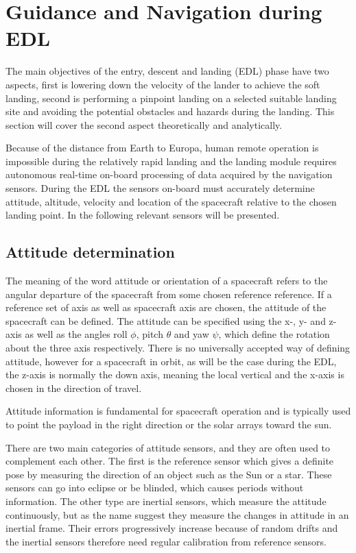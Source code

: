 \section{Guidance and Navigation during EDL}

The main objectives of the entry, descent and landing (EDL) phase have two aspects, first is lowering down the velocity of the lander to achieve the soft landing, second is performing a pinpoint landing on a selected suitable landing site and avoiding the potential obstacles and hazards during the landing. This section will cover the second aspect theoretically and analytically. 

Because of the distance from Earth to Europa, human remote operation is impossible during the relatively rapid landing and the landing module requires autonomous real-time on-board processing of data acquired by the navigation sensors. During the EDL the sensors on-board must accurately determine attitude, altitude, velocity and location of the spacecraft relative to the chosen landing point. In the following relevant sensors will be presented. 

\subsection{Attitude determination}

The meaning of the word attitude or orientation of a spacecraft refers to the angular departure of the spacecraft from some chosen reference reference. If a reference set of axis as well as spacecraft axis are chosen, the attitude of the spacecraft can be defined. The attitude can be specified using the x-, y- and z- axis as well as the angles roll $\phi$, pitch $\theta$ and yaw $\psi$, which define the rotation about the three axis respectively. There is no universally accepted way of defining attitude, however for a spacecraft in orbit, as will be the case during the EDL, the z-axis is normally the down axis, meaning the local vertical and the x-axis is chosen in the direction of travel.\cite{spacecraft}

Attitude information is fundamental for spacecraft operation and is typically used to point the payload in the right direction or the solar arrays toward the sun. 

There are two main categories of attitude sensors, and they are often used to complement each
other. The first is the reference sensor which gives a definite pose by measuring the direction of an object
such as the Sun or a star. These sensors can go into eclipse or be blinded, which causes periods without information. The other type are inertial sensors, which measure the attitude continuously, but as the name suggest they measure the changes in attitude in an inertial frame. Their errors progressively increase because of random drifts and the inertial sensors therefore need regular calibration from reference sensors. \cite{space}

